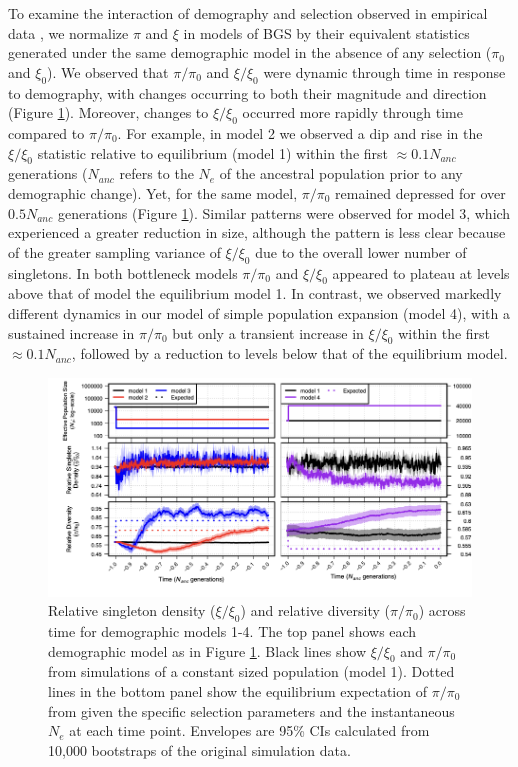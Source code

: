 \documentclass[9pt,twocolumn,twoside]{rilabRxiv}
\begin{document}
To examine the interaction of demography and selection observed in empirical data \citep{beissinger2016recent,torres2018human}, we normalize $\pi$ and $\xi$ in models of BGS by their equivalent statistics generated under the same demographic model in the absence of any selection ($\pi_0$ and $\xi_0$).
We observed that $\pi/\pi_0$ and $\xi/\xi_0$ were dynamic through time in response to demography, with changes occurring to both their magnitude and direction (Figure \ref{fig:1}). 
Moreover, changes to $\xi/\xi_0$ occurred more rapidly through time compared to $\pi/\pi_0$.
For example, in model 2 we observed a dip and rise in the $\xi/\xi_0$ statistic relative to equilibrium (model 1) within the first $\approx 0.1N_{anc}$ generations ($N_{anc}$ refers to the $N_e$ of the ancestral population prior to any demographic change).
Yet, for the same model, $\pi/\pi_0$ remained depressed for over $0.5N_{anc}$ generations (Figure \ref{fig:1}).
Similar patterns were observed for model 3, which experienced a greater reduction in size, although the pattern is less clear because of the greater sampling variance of $\xi/\xi_0$ due to the overall lower number of singletons.
In both bottleneck models  $\pi/\pi_0$ and $\xi/\xi_0$ appeared to plateau at levels above that of model the equilibrium model 1.
In contrast, we observed markedly different dynamics in our model of simple population expansion (model 4), with a sustained increase in $\pi/\pi_0$ but only a transient increase in $\xi/\xi_0$ within the first $\approx 0.1N_{anc}$, followed by a reduction to levels below that of the equilibrium model.

\begin{figure}[]
\includegraphics[width=\linewidth]{figures/tempF1.png}
\caption{Relative singleton density ($\xi/\xi_0$) and relative diversity ($\pi/\pi_0$) across time for demographic models 1-4.
The top panel shows each demographic model as in Figure \ref{fig:1}.
Black lines show $\xi/\xi_0$ and $\pi/\pi_0$ from simulations of a constant sized population (model 1).
Dotted lines in the bottom panel show the equilibrium  expectation of $\pi/\pi_0$ from  \citet{nordborg1996effect} given the specific selection parameters and the instantaneous $N_e$ at each time point.
Envelopes are 95\% CIs calculated from 10,000 bootstraps of the original simulation data.}
\label{fig:1}
\end{figure}
\end{document}
